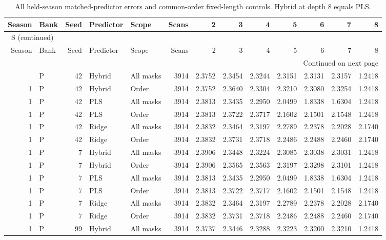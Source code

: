 \documentclass[10pt,a4paper]{article}
\renewcommand{\thetable}{S\arabic{table}}
\begin{document}
\begingroup\footnotesize
\setlength{\tabcolsep}{3.5pt}
\renewcommand{\arraystretch}{1.10}
\begin{longtable}{rlrllrrrrrrrr}
\caption{All held-season matched-predictor errors and common-order fixed-length controls. Hybrid at depth 8 equals PLS.}\label{tab:v2predictors}\\
\toprule
Season & Bank & Seed & Predictor & Scope & Scans & 2 & 3 & 4 & 5 & 6 & 7 & 8 \\
\midrule
\endfirsthead
\multicolumn{13}{l}{\tablename~\thetable{} (continued)}\\
\toprule
Season & Bank & Seed & Predictor & Scope & Scans & 2 & 3 & 4 & 5 & 6 & 7 & 8 \\
\midrule
\endhead
\midrule
\multicolumn{13}{r}{Continued on next page}\\
\endfoot
\bottomrule
\endlastfoot
1 & P & 42 & Hybrid & All masks & 3914 & 2.3752 & 2.3454 & 2.3244 & 2.3151 & 2.3131 & 2.3157 & 1.2418 \\
1 & P & 42 & Hybrid & Order & 3914 & 2.3752 & 2.3640 & 2.3304 & 2.3210 & 2.3080 & 2.3254 & 1.2418 \\
1 & P & 42 & PLS & All masks & 3914 & 2.3813 & 2.3435 & 2.2950 & 2.0499 & 1.8338 & 1.6304 & 1.2418 \\
1 & P & 42 & PLS & Order & 3914 & 2.3813 & 2.3722 & 2.3717 & 2.1602 & 2.1501 & 2.1548 & 1.2418 \\
1 & P & 42 & Ridge & All masks & 3914 & 2.3832 & 2.3464 & 2.3197 & 2.2789 & 2.2378 & 2.2028 & 2.1740 \\
1 & P & 42 & Ridge & Order & 3914 & 2.3832 & 2.3731 & 2.3718 & 2.2486 & 2.2488 & 2.2460 & 2.1740 \\
1 & P & 7 & Hybrid & All masks & 3914 & 2.3906 & 2.3448 & 2.3224 & 2.3085 & 2.3038 & 2.3031 & 1.2418 \\
1 & P & 7 & Hybrid & Order & 3914 & 2.3906 & 2.3565 & 2.3563 & 2.3197 & 2.3298 & 2.3101 & 1.2418 \\
1 & P & 7 & PLS & All masks & 3914 & 2.3813 & 2.3435 & 2.2950 & 2.0499 & 1.8338 & 1.6304 & 1.2418 \\
1 & P & 7 & PLS & Order & 3914 & 2.3813 & 2.3722 & 2.3717 & 2.1602 & 2.1501 & 2.1548 & 1.2418 \\
1 & P & 7 & Ridge & All masks & 3914 & 2.3832 & 2.3464 & 2.3197 & 2.2789 & 2.2378 & 2.2028 & 2.1740 \\
1 & P & 7 & Ridge & Order & 3914 & 2.3832 & 2.3731 & 2.3718 & 2.2486 & 2.2488 & 2.2460 & 2.1740 \\
1 & P & 99 & Hybrid & All masks & 3914 & 2.3737 & 2.3446 & 2.3288 & 2.3223 & 2.3200 & 2.3210 & 1.2418 \\

\end{longtable}
\end{document}
